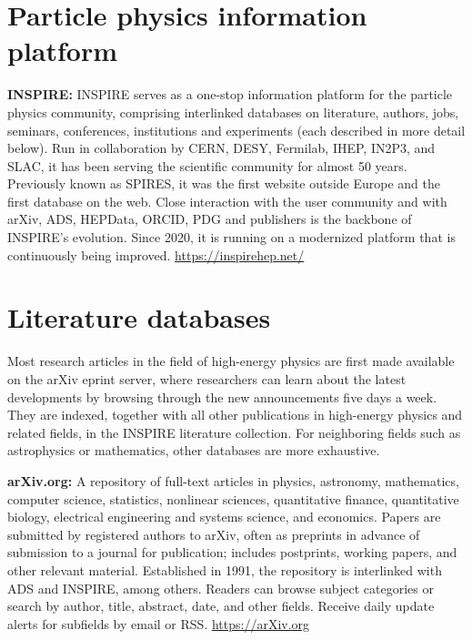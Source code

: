 \section{Particle physics information
platform}\label{databases:sec:platforms}


  \textbf{INSPIRE:} INSPIRE serves as a one-stop information platform
  for the particle physics community, comprising interlinked databases
  on literature, authors, jobs, seminars, conferences, institutions and
  experiments (each described in more detail below). Run in collaboration by CERN, DESY,
  Fermilab, IHEP, IN2P3, and SLAC, it has been serving the scientific
  community for almost 50 years. Previously known as SPIRES, it was the
  first website outside Europe and the first database on the web. Close
  interaction with the user community and with arXiv, ADS, HEPData,
  ORCID, PDG and publishers is the backbone of INSPIRE's evolution.
  Since 2020, it is running on a modernized platform that is continuously being improved.
  \url{https://inspirehep.net/}

\section{Literature databases}\label{databases:sec:literature}


Most research articles in the field of high-energy physics are first made
available on the arXiv eprint server, where researchers can learn about the
latest developments by browsing through the new announcements
five days a week. They are indexed, together with all other publications in
high-energy physics and related fields, in the INSPIRE literature collection.
For neighboring fields such as astrophysics or mathematics, other databases are
more exhaustive.

\item
  \textbf{arXiv.org:} A repository of full-text articles in physics,
  astronomy, mathematics, computer science, statistics, nonlinear
  sciences, quantitative finance, quantitative biology, electrical
  engineering and systems science, and economics. Papers are submitted
  by registered authors to arXiv, often as preprints in advance of
  submission to a journal for publication; includes postprints, working
  papers, and other relevant material. Established in 1991, the
  repository is interlinked with ADS and INSPIRE, among others. Readers
  can browse subject categories or search by author, title, abstract,
  date, and other fields. Receive daily update alerts for subfields by
  email or RSS. \url{https://arXiv.org}

